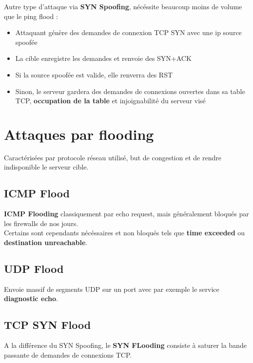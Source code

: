\documentclass{report}
\begin{document}
			Autre type d'attaque via \textbf{SYN Spoofing}, nécéssite beaucoup moins de volume que le ping flood : \\
			\begin{itemize}
				\item Attaquant génère des demandes de connexion TCP SYN avec une ip source spoofée
				\item La cible enregistre les demandes et renvoie des SYN+ACK
				\item Si la source spoofée est valide, elle renverra des RST
				\item Sinon, le serveur gardera des demandes de connexions ouvertes dans sa table TCP, \textbf{occupation de la table} et injoignabilité du serveur visé\\
			\end{itemize}


	\section{Attaques par flooding}

		Caractérisées par protocole réseau utilisé, but de congestion et de rendre indisponible le serveur cible.\\

		\subsection{ICMP Flood}

			\textbf{ICMP Flooding} classiquement par echo request, mais généralement bloqués par les firewalls de nos jours.\\

			Certains sont cependants nécéssaires et non bloqués tels que \textbf{time exceeded} ou \textbf{destination unreachable}.\\

		\subsection{UDP Flood}

			Envoie massif de segments UDP sur un port avec par exemple le service \textbf{diagnostic echo}.\\

		\subsection{TCP SYN Flood}

			A la différence du SYN Spoofing, le \textbf{SYN FLooding} consiste à saturer la bande passante de demandes de connexions TCP.\\
\end{document}
